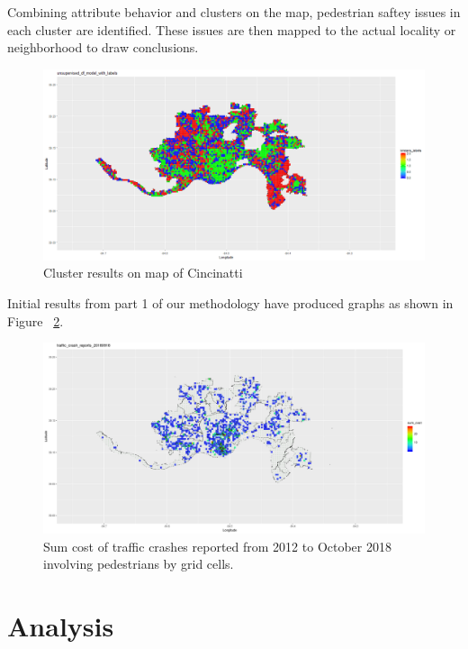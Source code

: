 \documentclass{llncs}
\begin{document}
Combining attribute behavior and clusters on the map, pedestrian saftey issues in each cluster are identified. These issues are then mapped to the actual locality or neighborhood to draw conclusions.

\FloatBarrier
\begin{figure}
 	\includegraphics[width=\textwidth, height=\textheight, keepaspectratio]{kmeansongrid.png}
 	\caption{Cluster results on map of Cincinatti}
	\label{figure : kmeansongrid}
\end{figure}
\FloatBarrier


Initial results from part 1 of our methodology have produced graphs as shown in Figure ~\ref{figure:SumCrashPlot}. \newline
\FloatBarrier
\begin{figure}
 	\includegraphics[width=\textwidth, height=\textheight, keepaspectratio]{TrafficCrashReports20180918SumCostMapped2Grid.png}
 	\caption{Sum cost of traffic crashes reported from 2012 to October 2018 involving pedestrians by grid cells.}
	\label{figure:SumCrashPlot}
\end{figure}
\FloatBarrier
%
\section{Analysis}
%
\end{document}
